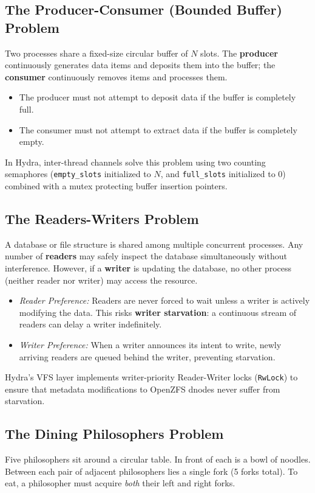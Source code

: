 \subsection{The Producer-Consumer (Bounded Buffer) Problem}
Two processes share a fixed-size circular buffer of $N$ slots. The \textbf{producer} continuously generates data items and deposits them into the buffer; the \textbf{consumer} continuously removes items and processes them.
\begin{itemize}
    \item The producer must not attempt to deposit data if the buffer is completely full.
    \item The consumer must not attempt to extract data if the buffer is completely empty.
\end{itemize}

In Hydra, inter-thread channels solve this problem using two counting semaphores (\texttt{empty\_slots} initialized to $N$, and \texttt{full\_slots} initialized to 0) combined with a mutex protecting buffer insertion pointers.

\subsection{The Readers-Writers Problem}
A database or file structure is shared among multiple concurrent processes. Any number of \textbf{readers} may safely inspect the database simultaneously without interference. However, if a \textbf{writer} is updating the database, no other process (neither reader nor writer) may access the resource.
\begin{itemize}
    \item \textit{Reader Preference:} Readers are never forced to wait unless a writer is actively modifying the data. This risks \textbf{writer starvation}: a continuous stream of readers can delay a writer indefinitely.
    \item \textit{Writer Preference:} When a writer announces its intent to write, newly arriving readers are queued behind the writer, preventing starvation.
\end{itemize}

Hydra's VFS layer implements writer-priority Reader-Writer locks (\texttt{RwLock}) to ensure that metadata modifications to OpenZFS dnodes never suffer from starvation.

\subsection{The Dining Philosophers Problem}
Five philosophers sit around a circular table. In front of each is a bowl of noodles. Between each pair of adjacent philosophers lies a single fork (5 forks total). To eat, a philosopher must acquire \textit{both} their left and right forks.

